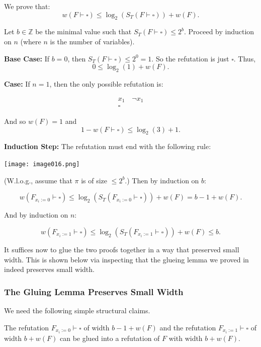 We prove that:
\[
w(F \vdash \square) \leq \log_2(S_T(F \vdash \square)) + w(F).
\]

Let $b \in \mathbb{Z}$ be the minimal value such that $S_T(F \vdash \square) \leq 2^b$.  
Proceed by induction on $n$ (where $n$ is the number of variables).

\textbf{Base Case:}  
If $b = 0$, then $S_T(F \vdash \square) \leq 2^0 = 1$. So the refutation is just $\square$.  
Thus,  
\[
0 \leq \log_2(1) + w(F).
\]

\textbf{Case:} If $n = 1$, then the only possible refutation is:

\[
\begin{array}{c}
    x_1 \quad \neg x_1 \\
    \hline
    \square
\end{array}
\]

And so $w(F) = 1$ and  
\[
1 - w(F \vdash \square) \leq \log_2(3) + 1.
\]

\textbf{Induction Step:}  
The refutation must end with the following rule:

\texttt{[image: image016.png]}


(W.l.o.g., assume that $\pi$ is of size $\leq 2^b$.) Then by induction on $b$:

\[
w(F_{x_i := 0} \vdash \square) \leq \log_2(S_T(F_{x_i := 0} \vdash \square)) + w(F) = b - 1 + w(F).
\]

And by induction on $n$:

\[
w(F_{x_i := 1} \vdash \square) \leq \log_2(S_T(F_{x_i := 1} \vdash \square)) + w(F) \leq b.
\]

It suffices now to glue the two proofs together in a way that preserved small width.
This is shown below via inspecting that the glueing lemma we proved in  indeed preserves small width. 
\subsubsection{The Gluing Lemma Preserves Small Width }

We need the following simple structural claims.


\begin{lemma}
The refutation $F_{x_i := 0} \vdash \square$ of width $b - 1 + w(F)$  
and the refutation $F_{x_i := 1} \vdash \square$ of width $b + w(F)$  
can be glued into a refutation of $F$ with width $b + w(F)$.
\end{lemma}

